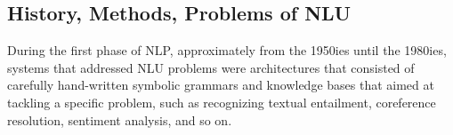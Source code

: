 
\subsection{History, Methods, Problems of NLU}







During the first phase of NLP, approximately from the 1950ies until the 1980ies, systems
that addressed NLU problems were architectures that consisted of carefully hand-written
symbolic grammars and knowledge bases that aimed at tackling a specific problem, such as
recognizing textual entailment, coreference resolution, sentiment analysis, and so on.

